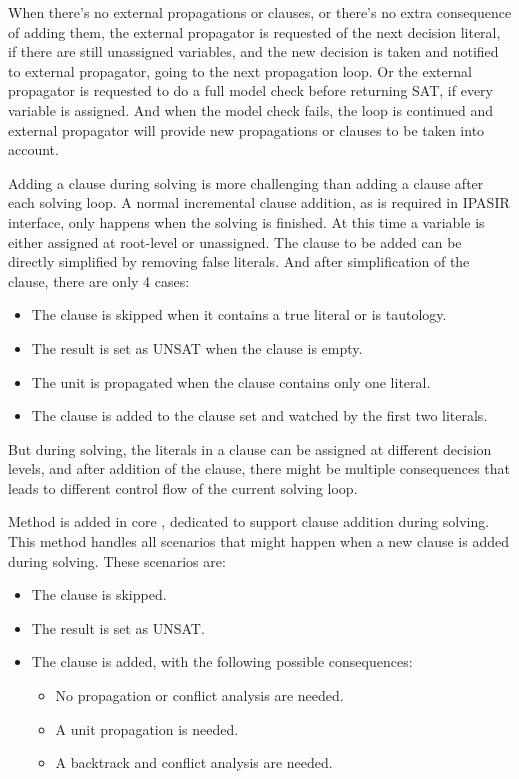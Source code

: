 When there's no external propagations or clauses, or there's no extra consequence of adding them, the external propagator is requested of the next decision literal, if there are still unassigned variables, and the new decision is taken and notified to external propagator, going to the next propagation loop. Or the external propagator is requested to do a full model check before returning SAT, if every variable is assigned. And when the model check fails, the loop is continued and external propagator will provide new propagations or clauses to be taken into account.

Adding a clause during solving is more challenging than adding a clause after each solving loop. A normal incremental clause addition, as is required in IPASIR interface, only happens when the solving is finished. At this time a variable is either assigned at root-level or unassigned. The clause to be added can be directly simplified by removing false literals. And after simplification of the clause, there are only 4 cases:

\begin{itemize}
  \item The clause is skipped when it contains a true literal or is tautology.
  \item The result is set as UNSAT when the clause is empty.
  \item The unit is propagated when the clause contains only one literal.
  \item The clause is added to the clause set and watched by the first two literals.
\end{itemize}

But during solving, the literals in a clause can be assigned at different decision levels, and after addition of the clause, there might be multiple consequences that leads to different control flow of the current solving loop.

Method  is added in core , dedicated to support clause addition during solving. This method handles all scenarios that might happen when a new clause is added during solving. These scenarios are:

\begin{itemize}
  \item The clause is skipped.
  \item The result is set as UNSAT.
  \item The clause is added, with the following possible consequences:
    \begin{itemize}
      \item No propagation or conflict analysis are needed.
      \item A unit propagation is needed.
      \item A backtrack and conflict analysis are needed.
    \end{itemize}
\end{itemize}

